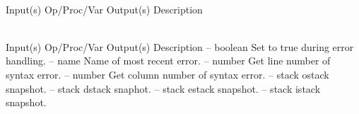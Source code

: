 \begin{longtable}{}
\caption{currenterror summary}
\\
\hline
\optableent
	{Input(s)}
	{Op/Proc/Var}
	{Output(s)}
	{Description}
\hline \hline
\endfirsthead
\caption[]{\emph{continued}} \\
\hline
\optableent
	{Input(s)}
	{Op/Proc/Var}
	{Output(s)}
	{Description}
\hline \hline \endhead
{} \endfoot
\hline \endlastfoot
\optableent
	{--}
	{{\bf {}}}
	{boolean}
	{Set to true during error handling.}
\hline
\optableent
	{--}
	{{\bf {}}}
	{name}
	{Name of most recent error.}
\hline
\optableent
	{--}
	{{\bf {}}}
	{number}
	{Get line number of syntax error.}
\hline
\optableent
	{--}
	{{\bf {}}}
	{number}
	{Get column number of syntax error.}
\hline
\optableent
	{--}
	{{\bf {}}}
	{stack}
	{ostack snapshot.}
\hline
\optableent
	{--}
	{{\bf {}}}
	{stack}
	{dstack snaphot.}
\hline
\optableent
	{--}
	{{\bf {}}}
	{stack}
	{estack snapshot.}
\hline
\optableent
	{--}
	{{\bf {}}}
	{stack}
	{istack snapshot.}
\end{longtable}

